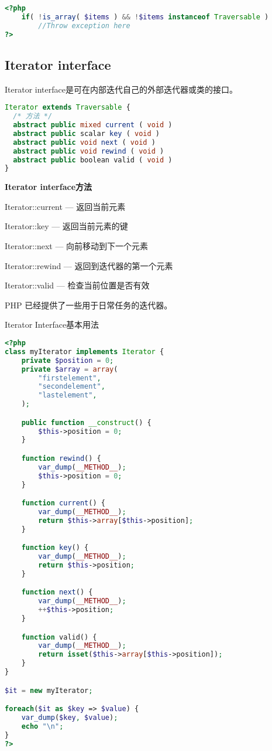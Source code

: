 \begin{lstlisting}[language=PHP]
<?php
    if( !is_array( $items ) && !$items instanceof Traversable )
        //Throw exception here
?>
\end{lstlisting}


\subsection{Iterator interface}



Iterator interface是可在内部迭代自己的外部迭代器或类的接口。



\begin{lstlisting}[language=PHP]
Iterator extends Traversable {
  /* 方法 */
  abstract public mixed current ( void )
  abstract public scalar key ( void )
  abstract public void next ( void )
  abstract public void rewind ( void )
  abstract public boolean valid ( void )
}
\end{lstlisting}

\textbf{Iterator interface方法}

\begin{compactitem}
\item Iterator::current — 返回当前元素
\item Iterator::key — 返回当前元素的键
\item Iterator::next — 向前移动到下一个元素
\item Iterator::rewind — 返回到迭代器的第一个元素
\item Iterator::valid — 检查当前位置是否有效
\end{compactitem}

PHP 已经提供了一些用于日常任务的迭代器。

\begin{example}
Iterator Interface基本用法
\begin{lstlisting}[language=PHP]
<?php
class myIterator implements Iterator {
    private $position = 0;
    private $array = array(
        "firstelement",
        "secondelement",
        "lastelement",
    );  

    public function __construct() {
        $this->position = 0;
    }

    function rewind() {
        var_dump(__METHOD__);
        $this->position = 0;
    }

    function current() {
        var_dump(__METHOD__);
        return $this->array[$this->position];
    }

    function key() {
        var_dump(__METHOD__);
        return $this->position;
    }

    function next() {
        var_dump(__METHOD__);
        ++$this->position;
    }

    function valid() {
        var_dump(__METHOD__);
        return isset($this->array[$this->position]);
    }
}

$it = new myIterator;

foreach($it as $key => $value) {
    var_dump($key, $value);
    echo "\n";
}
?>
\end{lstlisting}
\end{example}

